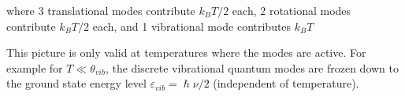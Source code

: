 \documentclass[book.tex]{subfiles}
\begin{document}
\noindent where 3 translational modes contribute $k_BT/2$ each, 2 rotational
modes contribute $k_BT/2$ each, and 1 vibrational mode contributes $k_BT$

This picture is only valid at temperatures where the modes are active. For example for $T \ll \theta_{vib}$, the discrete vibrational quantum modes are frozen down to the ground state energy level $\varepsilon_{vib} = \hslash \nu /2$ (independent of temperature).
\end{document}
